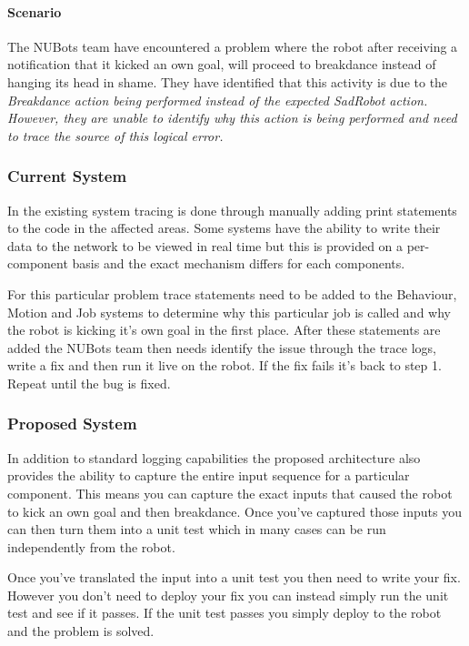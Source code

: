 \documentclass[english,12pt]{scrartcl}
\begin{document}
			\paragraph{Scenario} The NUBots team have encountered a problem where the robot after
			receiving a notification that it kicked an own goal, will proceed to breakdance instead
			of hanging its head in shame. They have identified that this activity is due to the
			\em{Breakdance} action being performed instead of the expected \em{SadRobot} action. However, they are unable to identify why this action is being performed and need to trace the source
			of this logical error.

			\subsubsection{Current System}
				In the existing system tracing is done through manually adding print statements to the code in the 
				affected areas. Some systems have the ability to write their data to the network to be viewed in real
				time but this is provided on a per-component basis and the exact mechanism differs for each components.
				
				For this particular problem trace statements need to be added to the Behaviour, Motion and Job systems to determine
				why this particular job is called and why the robot is kicking it's own goal in the first place. After these statements are added
				the NUBots team then needs identify the issue through the trace logs, write a fix and then run it live on the robot. If the 
				fix fails it's back to step 1. Repeat until the bug is fixed.
			\subsubsection{Proposed System}
				In addition to standard logging capabilities the proposed architecture also provides the ability to capture
				the entire input sequence for a particular component. This means you can capture the exact inputs that
				caused the robot to kick an own goal and then breakdance. Once you've captured those inputs you can then
				turn them into a unit test which in many cases can be run independently from the robot. 
				
				Once you've translated the input into a unit test you then need to write your fix. However you don't
				need to deploy your fix you can instead simply run the unit test and see if it passes. If the unit test passes
				you simply deploy to the robot and the problem is solved.
				
\end{document}
